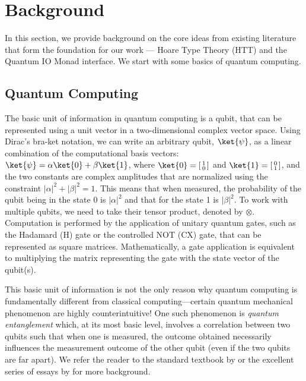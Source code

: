 \documentclass[acmsmall,nonacm,timestamp,review=false,anonymous=false]{acmart}
\begin{document}
\section{Background}
\label{sec:bg}
In this section, we provide background on the core ideas from existing literature that form the foundation for our work --- Hoare Type Theory (HTT) and the Quantum IO Monad interface. We start with some basics of quantum computing.

\subsection{Quantum Computing}
\label{sec:qc}
The basic unit of information in quantum computing is a qubit, that can be represented using a unit vector in a two-dimensional complex vector space. Using Dirac's bra-ket notation, we can write an arbitrary qubit, $\ket{\psi}$, as a linear combination of the computational basis vectors: $\ket{\psi} = \alpha\ket{0} + \beta\ket{1}$, where $\ket{0}=\begin{bsmallmatrix}
1 \\
0
\end{bsmallmatrix}$ and $\ket{1}=\begin{bsmallmatrix}
0 \\
1
\end{bsmallmatrix}$, and the two constants are complex amplitudes that are normalized using the constraint $|\alpha|^2 +|\beta|^2 = 1$. This means that when measured, the probability of the qubit being in the state 0 is $|\alpha|^2$ and that for the state 1 is $|\beta|^2$. To work with multiple qubits, we need to take their tensor product, denoted by $\otimes$. Computation is performed by the application of unitary quantum gates, such as the Hadamard (H) gate or the controlled NOT (CX) gate, that can be represented as square matrices. Mathematically, a gate application is equivalent to multiplying the matrix representing the gate with the state vector of the qubit(s).

This basic unit of information is not the only reason why quantum computing is fundamentally different from classical computing---certain quantum mechanical phenomenon are highly counterintuitive! One such phenomenon is \textit{quantum entanglement} which, at its most basic level, involves a correlation between two qubits such that when one is measured, the outcome obtained necessarily influences the measurement outcome of the other qubit (even if the two qubits are far apart). %
We refer the reader to the standard textbook by \citet{nielsen_quantum_2010} or the excellent series of essays by \citet{matuschak2019} for more background.
\end{document}
